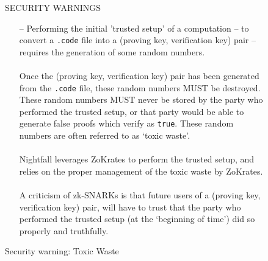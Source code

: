 \documentclass{article}
\begin{document}
\begin{figure}[H]
  \begin{center}
    \begin{mdframed}[backgroundcolor=verylightred]
      \noindent
      SECURITY WARNINGS
        \begin{itemize}
          \item[--] Performing the initial 'trusted setup' of a computation -- to convert a \texttt{.code} file into a (proving key, verification key) pair -- requires the generation of some random numbers.\\
          \\
          Once the (proving key, verification key) pair has been generated from the \texttt{.code} file, these random numbers MUST be destroyed. These random numbers MUST never be stored by the party who performed the trusted setup, or that party would be able to generate false proofs which verify as \texttt{true}. These random numbers are often referred to as `toxic waste'.\\
          \\
          Nightfall leverages ZoKrates to perform the trusted setup, and relies on the proper management of the toxic waste by ZoKrates.\\
          \\
          A criticism of zk-SNARKs is that future users of a (proving key, verification key) pair, will have to trust that the party who performed the trusted setup (at the `beginning of time') did so properly and truthfully.
        \end{itemize}
    \end{mdframed}
  \end{center}
  \caption{Security warning: Toxic Waste}
  \label{fig:trustedSetupWarning}
\end{figure}
\end{document}
